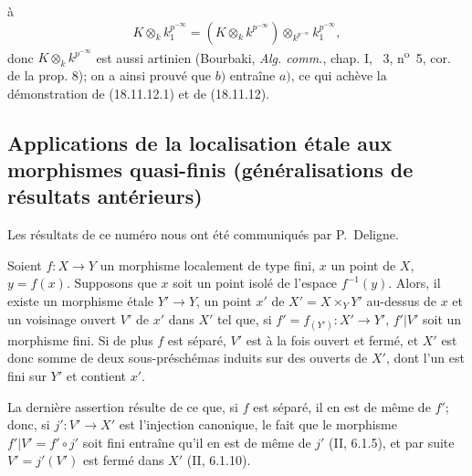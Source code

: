 
à
\[
  K\otimes_k k_1^{p^{-\infty}}=(K\otimes_k k^{p^{-\infty}})\otimes_{k^{p^{-\infty}}}k_1^{p^{-\infty}},
\]
donc $K\otimes_k k^{p^{-\infty}}$ est aussi artinien (Bourbaki, \emph{Alg. comm.}, chap. I, \textsection~3, n\textsuperscript{o}~5, cor. de la prop. 8); on a ainsi prouvé que $b)$ entraîne $a)$, ce qui achève la démonstration de (18.11.12.1) et de (18.11.12).

\subsection{Applications de la localisation étale aux morphismes quasi-finis (généralisations de résultats antérieurs)}

Les résultats de ce numéro nous ont été communiqués par P.~Deligne.

\begin{theorem}[18.12.1]
\label{IV.18.12.1}
Soient $f:X\to Y$ un morphisme localement de type fini, $x$ un point de $X$, $y=f(x)$. Supposons que $x$ soit un point isolé de l'espace $f^{-1}(y)$. Alors, il existe un morphisme étale $Y'\to Y$, un point $x'$ de $X'=X\times_Y Y'$ au-dessus de $x$ et un voisinage ouvert $V'$ de $x'$ dans $X'$ tel que, si $f'=f_{(Y')}:X'\to Y'$, $f'|V'$ soit un morphisme fini. Si de plus $f$ est séparé, $V'$ est à la fois ouvert et fermé, et $X'$ est donc somme de deux sous-préschémas induits sur des ouverts de $X'$, dont l'un est fini sur $Y'$ et contient $x'$.
\end{theorem}

La dernière assertion résulte de ce que, si $f$ est séparé, il en est de même de $f'$; donc, si $j':V'\to X'$ est l'injection canonique, le fait que le morphisme $f'|V'=f'\circ j'$ soit fini entraîne qu'il en est de même de $j'$ (II, 6.1.5), et par suite $V'=j'(V')$ est fermé dans $X'$ (II, 6.1.10).

